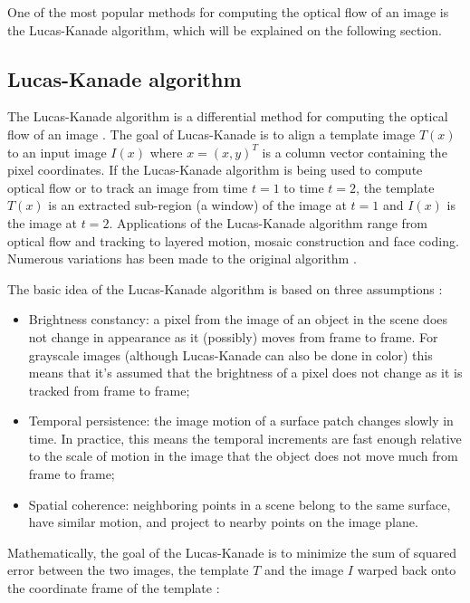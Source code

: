 \documentclass[msc, a4paper, classic, en]{ufbathesis}
\begin{document}
One of the most popular methods for computing the optical flow of an image is the Lucas-Kanade algorithm, which will be explained on the following section.

\subsection{Lucas-Kanade algorithm}

The Lucas-Kanade \cite{lk} algorithm is a differential method for computing the optical flow of an image \cite{kinectkanade}. The goal of Lucas-Kanade is to align a template image $T(x)$ to an input image $I(x)$ where $x = (x, y)^T$ is a column vector containing the pixel coordinates. If the Lucas-Kanade algorithm is being used to compute optical flow or to track an image from time $t = 1$ to time $t = 2$, the template $T(x)$ is an extracted sub-region (a window) of the image at $t = 1$ and $I(x)$ is the image at $t = 2$. Applications of the Lucas-Kanade algorithm range from optical flow and tracking to layered motion, mosaic construction and face coding. Numerous variations has been made to the original algorithm \cite{lk20}.

The basic idea of the Lucas-Kanade algorithm is based on three assumptions \cite{bradski2008learning}:

\begin{itemize}
  \item Brightness constancy: a pixel from the image of an object in the scene does not change in appearance as it (possibly) moves from frame to frame. For grayscale images (although Lucas-Kanade can also be done in color) this means that it's assumed that the brightness of a pixel does not change as it is tracked from frame to frame;
  \item Temporal persistence: the image motion of a surface patch changes slowly in time. In practice, this means the temporal increments are fast enough relative to the scale of motion in the image that the object does not move much from frame to frame;
  \item Spatial coherence: neighboring points in a scene belong to the same surface, have similar motion, and project to nearby points on the image plane.
\end{itemize}

Mathematically, the goal of the Lucas-Kanade is to minimize the sum of squared error between the two images, the template $T$ and the image $I$ warped back onto the coordinate frame of the template \cite{lk20}:
\end{document}
